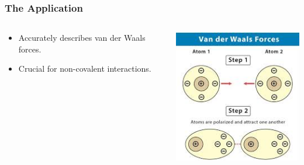 \begin{frame}
    \frametitle{The Application}
     \begin{columns}[T]
        \begin{column}{0.4\textwidth}
            \vspace{2cm}
            \begin{itemize}
                \item Accurately describes van der Waals forces.
                \item Crucial for non-covalent interactions.
            \end{itemize}
        \end{column}
        \begin{column}{0.5\textwidth}
            \includegraphics[width=\textwidth]{images/MP22.jpg}
        \end{column}
    \end{columns}
\end{frame}

